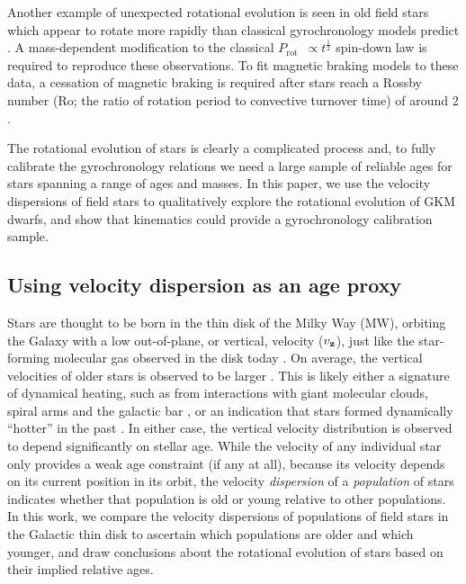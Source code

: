 \documentclass{aastex63}
\newcommand{\eg}{{\it e.g.}}
\newcommand{\prot}{$P_{\mathrm{rot}}$}
\newcommand{\vz}{$v_{\bf z}$}
\newcommand{\racomment}[1]{{\color{black}#1}}
\begin{document}
Another example of unexpected rotational evolution is seen in old field stars
which appear to rotate more rapidly than classical gyrochronology models
predict \citep{angus2015, vansaders2016, vansaders2018, metcalfe2019}.
A mass-dependent modification to the classical \prot\ $\propto
t^{\frac{1}{2}}$ spin-down law \citep{skumanich1972} is required to reproduce
these observations.
To fit magnetic braking models to these data, a cessation of magnetic braking
is required after stars reach a Rossby number (Ro; the ratio of rotation
period to convective turnover time) of around 2 \citep{vansaders2016,
vansaders2018}.

The rotational evolution of stars is clearly a complicated process and, to
fully calibrate the gyrochronology relations we need a large sample of
reliable ages for stars spanning a range of ages and masses.
In this paper, we use the velocity dispersions of field stars to qualitatively
explore the rotational evolution of GKM dwarfs, and show that kinematics could
provide a gyrochronology calibration sample.

\subsection{Using velocity dispersion as an age proxy}

Stars are thought to be born in the thin disk of the Milky Way (MW), orbiting
the Galaxy with a low out-of-plane, or vertical, velocity (\vz),
just like the star-forming molecular gas observed in the disk today
\citep[\eg][]{stark1989, stark2005, aumer2009, martig2014, aumer2016}.
On average, the vertical velocities of older stars is observed to be larger
\citep[\eg][]{nordstrom2004, holmberg2007, holmberg2009, aumer2009,
casagrande2011}.
This is likely either a signature of dynamical heating, such as from
interactions with giant molecular clouds, spiral arms and the galactic bar
\citep[see][for a review of secular evolution in the MW]{sellwood2014}, or an
indication that stars formed dynamically ``hotter'' in the past
\citep[e.g.,][]{bird2013}.
In either case, the vertical velocity distribution is observed to depend
significantly on stellar age.
While the velocity of any individual star only provides a weak age constraint
\racomment{(if any at all)}, because its velocity depends on its current
position in its orbit, the velocity {\it dispersion} of a {\it population} of
stars indicates whether that population is old or young relative to other
populations.
In this work, we compare the velocity dispersions of populations of field
stars in the Galactic thin disk to ascertain which populations are older and
which younger, and draw conclusions about the rotational evolution of stars
based on their implied relative ages.
\end{document}

